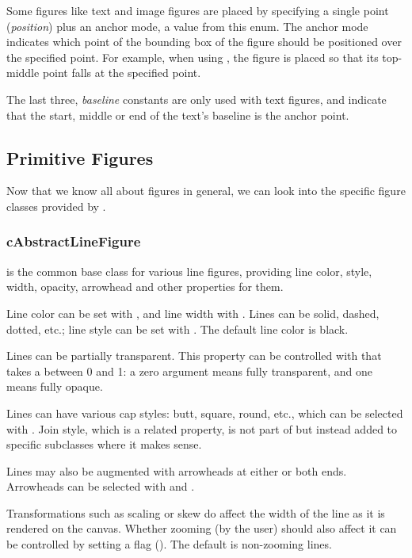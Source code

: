 Some figures like text and image figures are placed by specifying a single
point (\textit{position}) plus an anchor mode, a value from this enum. The
anchor mode indicates which point of the bounding box of the figure should
be positioned over the specified point. For example, when using
, the figure is placed so that its top-middle point falls at
the specified point.

The last three, \textit{baseline} constants are only used with text
figures, and indicate that the start, middle or end of the text's baseline
is the anchor point.


\subsection{Primitive Figures}
\label{sec:graphics:primitive-figures}

Now that we know all about figures in general, we can look into the
specific figure classes provided by {\opp}.

\subsubsection{cAbstractLineFigure}
\label{sec:graphics:abstractlinefigure}

 is the common base class for various line
figures, providing line color, style, width, opacity, arrowhead and other
properties for them.

Line color can be set with , and line width with
. Lines can be solid, dashed, dotted, etc.; line
style can be set with . The default line color is
black.

Lines can be partially transparent. This property can be controlled with
 that takes a  between 0 and 1: a zero
argument means fully transparent, and one means fully opaque.

Lines can have various cap styles: butt, square, round, etc., which can be
selected with . Join style, which is a related
property, is not part of  but instead added to
specific subclasses where it makes sense.

Lines may also be augmented with arrowheads at either or both ends.
Arrowheads can be selected with  and
.

Transformations such as scaling or skew do affect the width of the line as it
is rendered on the canvas. Whether zooming (by the user) should also affect
it can be controlled by setting a flag ().
The default is non-zooming lines.

